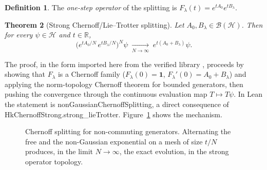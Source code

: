 \documentclass[11pt,a4paper]{article}
\theoremstyle{plain}
\newtheorem{theorem}{Theorem}[section]
\theoremstyle{definition}
\newtheorem{definition}[theorem]{Definition}
\theoremstyle{remark}
\newcommand{\R}{\mathbb{R}}
\let\leanoldunderscore\_
\newcommand{\leanbreakunderscore}{\leanoldunderscore\allowbreak}
\newcommand{\lean}[1]{{\ttfamily\hyphenchar\font=-1\relax
  \let\_\leanbreakunderscore #1}}
\begin{document}
\begin{definition}
The \emph{one-step operator} of the splitting is
$F_\lambda(t)=e^{tA_0}e^{tB_\lambda}$.
\end{definition}

\begin{theorem}[Strong Chernoff/Lie--Trotter splitting]
\label{thm:chernoff}
Let $A_0,B_\lambda\in\mathcal{B}(\mathcal{H})$. Then for every $\psi\in\mathcal{H}$ and
$t\in\R$,
\[
\Big(e^{tA_0/N}\,e^{tB_\lambda/N}\Big)^{N}\psi
\;\xrightarrow[N\to\infty]{}\;
e^{t(A_0+B_\lambda)}\psi .
\]
\end{theorem}

The proof, in the form imported here from the verified library
\cite{BerdinskyUshakov2026}, proceeds by showing that $F_\lambda$ is a Chernoff family
($F_\lambda(0)=\mathbf{1}$, $F_\lambda'(0)=A_0+B_\lambda$) and applying the norm-topology
Chernoff theorem for bounded generators, then pushing the convergence through the
continuous evaluation map $T\mapsto T\psi$. In Lean the statement is
\lean{nonGaussianChernoffSplitting}, a direct consequence of
\lean{HkChernoffStrong.strong\_lieTrotter}. Figure~\ref{fig:chernoff} shows the mechanism.

\begin{figure}[htbp]
\centering
{}
\caption{Chernoff splitting for non-commuting generators. Alternating the free and the
non-Gaussian exponential on a mesh of size $t/N$ produces, in the limit $N\to\infty$,
the exact evolution, in the strong operator topology.}
\label{fig:chernoff}
\end{figure}
\end{document}
